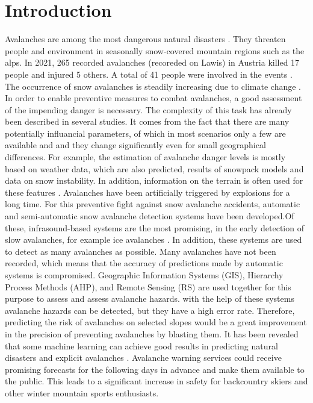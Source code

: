 \documentclass[12pt,a4paper]{article}
\title{\titlename}
\author{ \authorname\\ \scriptsize \authormail \\ \scriptsize \address }
\author{ \authorid\\ \scriptsize \address }
\date{\exposedate}
\begin{document}



\maketitle

\tableofcontents
\newpage










\section{Introduction}
Avalanches are among the most dangerous natural disasters \autocite{Lawine:2019}. They threaten people and environment in seasonally snow-covered mountain regions such as the alps. In 2021, 265 recorded avalanches (recoreded on Lawis) in Austria killed 17 people and injured 5 others. A total of 41 people were involved in the events \autocite[]{Lawis:2022}. The occurrence of snow avalanches is steadily increasing due to climate change \autocite{Martin:2001} \autocite[]{Tiwari:2021} \autocite{Bahram:2019}.  In order to enable preventive measures to combat avalanches, a good assessment of the impending danger is necessary. The complexity of this task has already been described in several studies. It comes from the fact that there are many potentially influancial parameters, of which in most scenarios only a few are available and and they change significantly even for small geographical differences. For example, the estimation of avalanche danger levels is mostly based on weather data, which are also predicted, results of snowpack models and data on snow instability. In addition, information on the terrain is often used for these features \autocite{Bahram:2019}. Avalanches have been artificially triggered by explosions for a long time. For this preventive fight against snow avalanche accidents, automatic and semi-automatic snow avalanche detection systems have been developed.Of these, infrasound-based systems are the most promising, in the early detection of slow avalanches, for example ice avalanches \autocite{THURING201560} \autocite{Lawine:2019}. In addition, these systems are used to detect as many avalanches as possible. Many avalanches have not been recorded, which means that the accuracy of predictions made by automatic systems is compromised. Geographic Information Systems (GIS), Hierarchy Process Methods (AHP), and Remote Sensing (RS) are used together for this purpose to assess and assess avalanche hazards. with the help of these systems avalanche hazards can be detected, but they have a high error rate. Therefore, predicting the risk of avalanches on selected slopes would be a great improvement in the precision of preventing avalanches by blasting them.  It has been revealed that some machine learning can achieve good results in predicting natural disasters and explicit avalanches \autocite[]{Martin:2001} \autocite[]{Tiwari:2021} \autocite{Bahram:2019}. Avalanche warning services could receive promising forecasts for the following days in advance and make them available to the public. This leads to a significant increase in safety for backcountry skiers and other winter mountain sports enthusiasts.
\end{document}
